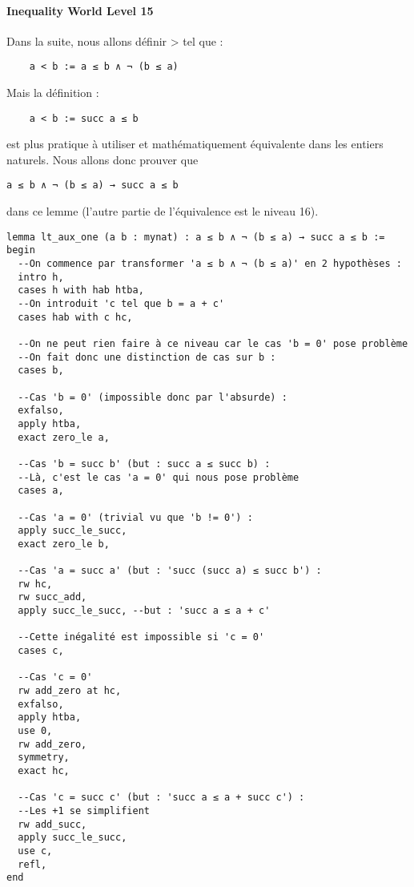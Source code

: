 \paragraph{Inequality World Level 15}

Dans la suite, nous allons définir > tel que :
\begin{verbatim}
    a < b := a ≤ b ∧ ¬ (b ≤ a)
\end{verbatim}
Mais la définition :
\begin{verbatim}
    a < b := succ a ≤ b
\end{verbatim}
est plus pratique à utiliser et mathématiquement équivalente dans les entiers naturels.
Nous allons donc prouver  que 
\begin{verbatim}
a ≤ b ∧ ¬ (b ≤ a) → succ a ≤ b
\end{verbatim}
dans ce lemme (l'autre partie de l'équivalence est le niveau 16).

\begin{verbatim}
lemma lt_aux_one (a b : mynat) : a ≤ b ∧ ¬ (b ≤ a) → succ a ≤ b :=
begin
  --On commence par transformer 'a ≤ b ∧ ¬ (b ≤ a)' en 2 hypothèses :
  intro h,
  cases h with hab htba,
  --On introduit 'c tel que b = a + c'
  cases hab with c hc,

  --On ne peut rien faire à ce niveau car le cas 'b = 0' pose problème
  --On fait donc une distinction de cas sur b :
  cases b,

  --Cas 'b = 0' (impossible donc par l'absurde) :
  exfalso,
  apply htba,
  exact zero_le a,

  --Cas 'b = succ b' (but : succ a ≤ succ b) :
  --Là, c'est le cas 'a = 0' qui nous pose problème
  cases a,

  --Cas 'a = 0' (trivial vu que 'b != 0') :
  apply succ_le_succ,
  exact zero_le b,

  --Cas 'a = succ a' (but : 'succ (succ a) ≤ succ b') :
  rw hc,
  rw succ_add,
  apply succ_le_succ, --but : 'succ a ≤ a + c'
  
  --Cette inégalité est impossible si 'c = 0'
  cases c,

  --Cas 'c = 0'
  rw add_zero at hc,
  exfalso,
  apply htba,
  use 0,
  rw add_zero,
  symmetry,
  exact hc,

  --Cas 'c = succ c' (but : 'succ a ≤ a + succ c') :
  --Les +1 se simplifient
  rw add_succ,
  apply succ_le_succ,
  use c,
  refl,
end
\end{verbatim}
